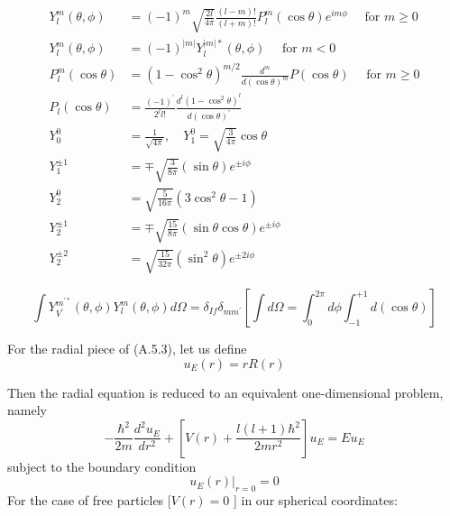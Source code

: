 \documentclass{article}
\begin{document}
\begin{equation}
\begin{aligned}
Y_{l}^{m}(\theta, \phi) &=(-1)^{m} \sqrt{\frac{2 l}{4 \pi}} \frac{(l-m) !}{(l+m) !} P_{l}^{m}(\cos \theta) e^{i m \phi} \quad \text { for } m \geq 0 \\
Y_{l}^{m}(\theta, \phi) &=(-1)^{|m|} Y_{l}^{|m| *}(\theta, \phi) \quad \text { for } m<0 \\
P_{l}^{m}(\cos \theta) &=\left(1-\cos ^{2} \theta\right)^{m / 2} \frac{d^{m}}{d(\cos \theta)^{m}} P(\cos \theta) \quad \text { for } m \geq 0 \\
P_{l}(\cos \theta) &=\frac{(-1)^{\prime}}{2^{l} l !} \frac{d^{l}\left(1-\cos ^{2} \theta\right)^{l}}{d(\cos \theta)^{\prime}} \\
Y_{0}^{0} &=\frac{1}{\sqrt{4 \pi}}, \quad Y_{1}^{0}=\sqrt{\frac{3}{4 \pi}} \cos \theta \\
Y_{1}^{\pm 1} &=\mp \sqrt{\frac{3}{8 \pi}}(\sin \theta) e^{\pm i \phi} \\
Y_{2}^{0} &=\sqrt{\frac{5}{16 \pi}}\left(3 \cos ^{2} \theta-1\right) \\
Y_{2}^{\pm 1} &=\mp \sqrt{\frac{15}{8 \pi}}(\sin \theta \cos \theta) e^{\pm i \phi} \\
Y_{2}^{\pm 2} &=\sqrt{\frac{15}{32 \pi}}\left(\sin ^{2} \theta\right) e^{\pm 2 i \phi}
\end{aligned}
\end{equation}

\begin{equation}
\int Y_{V^{\prime}}^{m^{\prime *}}(\theta, \phi) Y_{l}^{m}(\theta, \phi) d \Omega=\delta_{I f} \delta_{m m^{\prime}}\left[\int d \Omega=\int_{0}^{2 \pi} d \phi \int_{-1}^{+1} d(\cos \theta)\right]    
\end{equation}


For the radial piece of (A.5.3), let us define
\begin{equation}
u_{E}(r)=r R(r)
\end{equation}

Then the radial equation is reduced to an equivalent one-dimensional problem, namely
\begin{equation}
-\frac{\hbar^{2}}{2 m} \frac{d^{2} u_{E}}{d r^{2}}+\left[V(r)+\frac{l(l+1) \hbar^{2}}{2 m r^{2}}\right] u_{E}=E u_{E}
\end{equation}
subject to the boundary condition
$$
\left.u_{E}(r)\right|_{r=0}=0
$$
For the case of free particles $[V(r)=0$ ] in our spherical coordinates:
\end{document}
